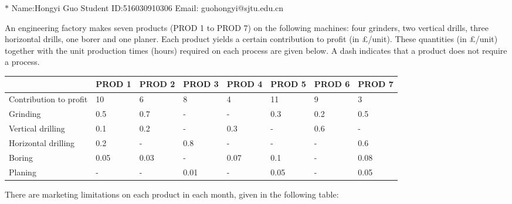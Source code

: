 \documentclass[12pt,a4paper]{article}
\theoremstyle{definition}
\begin{document}
\noindent

\noindent{}
\begin{center}

\footnotesize{\color{blue}$*$ Name:Hongyi Guo  \quad Student ID:516030910306 \quad Email: guohongyi@sjtu.edu.cn}
\end{center}


An engineering factory makes seven products (PROD 1 to PROD 7) on the following machines: four grinders, two vertical drills, three horizontal drills, one borer and one planer. Each product yields a certain contribution to profit (in \pounds/unit). These quantities (in \pounds/unit) together with the unit production times (hours) required on each process are given below. A dash indicates that a product does not require a process.

\begin{table}[htbp]
  \scriptsize
  \centering
  \renewcommand\arraystretch{1.1}
  \begin{tabular}{m{} m{}<{\centering} m{}<{\centering} m{}<{\centering} m{}<{\centering} m{}<{\centering} m{}<{\centering} m{}<{\centering}}
  \hline
   & \textbf{PROD 1} & \textbf{PROD 2} & \textbf{PROD 3} & \textbf{PROD 4} & \textbf{PROD 5} & \textbf{PROD 6} &  \textbf{PROD 7} \\\hline
  Contribution to profit & 10 & 6 & 8 & 4 & 11 & 9 & 3 \\
  Grinding & 0.5 & 0.7 & - & - & 0.3 & 0.2 & 0.5 \\
  Vertical drilling & 0.1 & 0.2 & - & 0.3 & - & 0.6 & - \\
  Horizontal drilling & 0.2 & - & 0.8 & - & - & - & 0.6 \\
  Boring & 0.05 & 0.03 & - & 0.07 & 0.1 & - & 0.08 \\
  Planing & - & - & 0.01 & - & 0.05 & - & 0.05 \\
  \hline
  \end{tabular}
\end{table}

There are marketing limitations on each product in each month, given in the following table:
\end{document}
